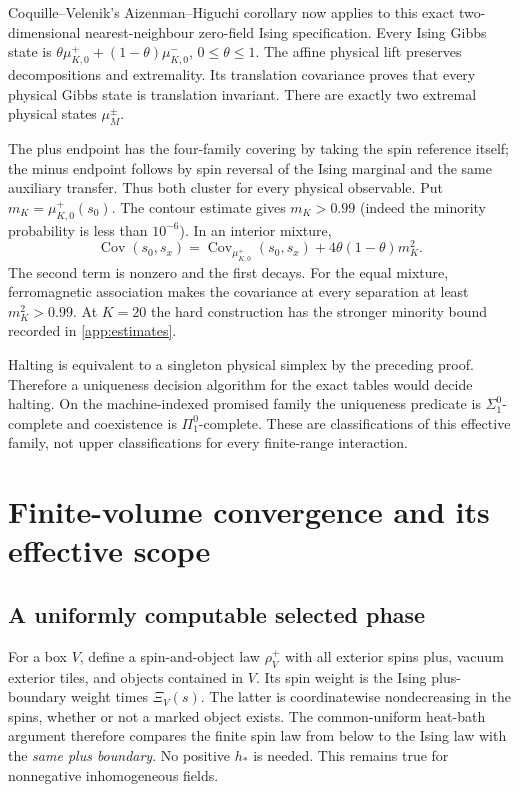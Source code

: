 \documentclass[11pt,reqno]{amsart}
\numberwithin{equation}{section}
\theoremstyle{definition}
\theoremstyle{remark}
\newcommand{\Cov}{\operatorname{Cov}}
\begin{document}
Coquille--Velenik's Aizenman--Higuchi corollary now applies to this exact two-dimensional nearest-neighbour zero-field Ising specification. Every Ising Gibbs state is $\theta\mu_{K,0}^++(1-\theta)\mu_{K,0}^-$, $0\leq\theta\leq1$. The affine physical lift preserves decompositions and extremality. Its translation covariance proves that every physical Gibbs state is translation invariant. There are exactly two extremal physical states $\mu_M^\pm$.

The plus endpoint has the four-family covering by taking the spin reference itself; the minus endpoint follows by spin reversal of the Ising marginal and the same auxiliary transfer. Thus both cluster for every physical observable. Put $m_K=\mu_{K,0}^+(s_0)$. The contour estimate gives $m_K>0.99$ (indeed the minority probability is less than $10^{-6}$). In an interior mixture,
\begin{equation}\label{eq:mixturecov}
 \Cov(s_0,s_x)=\Cov_{\mu_{K,0}^+}(s_0,s_x)+4\theta(1-\theta)m_K^2.
\end{equation}
The second term is nonzero and the first decays. For the equal mixture, ferromagnetic association makes the covariance at every separation at least $m_K^2>0.99$. At $K=20$ the hard construction has the stronger minority bound recorded in \cref{app:estimates}.

Halting is equivalent to a singleton physical simplex by the preceding proof. Therefore a uniqueness decision algorithm for the exact tables would decide halting. On the machine-indexed promised family the uniqueness predicate is $\Sigma^0_1$-complete and coexistence is $\Pi^0_1$-complete. These are classifications of this effective family, not upper classifications for every finite-range interaction.


\section{Finite-volume convergence and its effective scope}\label{sec:convergence}

\subsection{A uniformly computable selected phase}
For a box $V$, define a spin-and-object law $\rho_V^+$ with all exterior spins plus, vacuum exterior tiles, and objects contained in $V$. Its spin weight is the Ising plus-boundary weight times $\Xi_V(s)$. The latter is coordinatewise nondecreasing in the spins, whether or not a marked object exists. The common-uniform heat-bath argument therefore compares the finite spin law from below to the Ising law with the \emph{same plus boundary}. No positive $h_*$ is needed. This remains true for nonnegative inhomogeneous fields.
\end{document}
